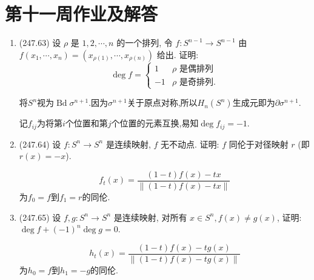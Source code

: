 \section{第十一周作业及解答}
\begin{enumerate}
    \item(247.63) 设 $\rho$ 是 $1, 2, \cdots, n$ 的一个排列, 令 $f: S^{n-1} \to S^{n-1}$ 由 $f(x_1, \cdots, x_n) = (x_{\rho(1)}, \cdots, x_{\rho(n)})$ 给出. 证明:
    \[
        \deg f = \begin{cases}
            1 & \rho \text{ 是偶排列} \\
            -1 & \rho \text{ 是奇排列}.
        \end{cases}
    \]
    \begin{proofc}[解答]
        将$S^n$视为$\operatorname{Bd}\sigma^{n+1}$.因为$\sigma^{n+1}$关于原点对称,所以$H_n(S^n)$生成元即为$\partial\sigma^{n+1}$.\par
        记$f_{ij}$为将第$i$个位置和第$j$个位置的元素互换,易知$\deg f_{ij}=-1$.
    \end{proofc}
    \item(247.64) 设 $f: S^n \to S^n$ 是连续映射, $f$ 无不动点. 
    证明: $f$ 同伦于对径映射 $r$ (即 $r(x) = -x$).
    \begin{proofc}[解答]
        $$f_t(x)=\frac{(1-t)f(x)-tx}{\|(1-t)f(x)-tx\|}$$
        为$f_0=f$到$f_1=r$的同伦.

    \end{proofc}
    \item(247.65) 设 $f, g: S^n \to S^n$ 是连续映射, 对所有 $x \in S^n, f(x) \neq g(x)$, 证明: $\deg f + (-1)^n \deg g = 0$.
    \begin{proofc}[解答]
        $$h_t(x)=\frac{(1-t)f(x)-tg(x)}{\|(1-t)f(x)-tg(x)\|}$$
        为$h_0=f$到$h_1=-g$的同伦.

    \end{proofc}
\end{enumerate}